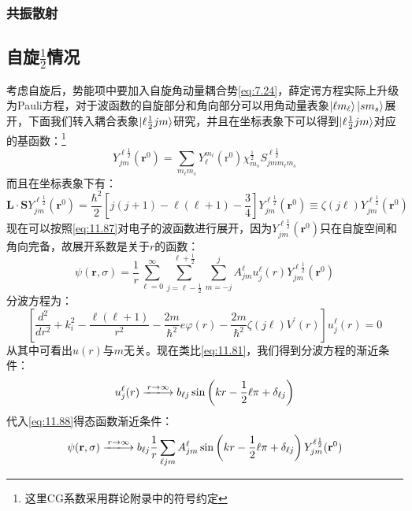\documentclass[a4paper,zihao=-4,linespread=1]{ctexrep}
\begin{document}
	\subsubsection{共振散射}
	
	
	\subsection{自旋$\frac{1}{2}$情况}
	考虑自旋后，势能项中要加入自旋角动量耦合势\ref{eq:7.24}，薛定谔方程实际上升级为Pauli方程，对于波函数的自旋部分和角向部分可以用角动量表象$\ket{\ell m_\ell}\ket{sm_s}$展开，下面我们转入耦合表象$\ket{\ell\frac{1}{2}jm}$研究，并且在坐标表象下可以得到$\ket{\ell\frac{1}{2}jm}$对应的基函数：\footnote{这里CG系数采用群论附录中的符号约定}
	\begin{equation}
		\label{eq:11.87}
		Y^{\ell\frac{1}{2}}_{jm}(\mathbf{r}^0)=\sum_{m_\ell m_s}Y^{m_\ell}_\ell (\mathrm{r}^0)\chi_{m_s}^\frac{1}{2}S_{jmm_\ell m_s}^{\ell\frac{1}{2}}
	\end{equation}
	而且在坐标表象下有：
	\[\mathbf{L}\cdot\mathbf{S}Y^{\ell\frac{1}{2}}_{jm}(\mathbf{r}^0)=\frac{\hbar^2}{2}\left[j(j+1)-\ell(\ell+1)-\frac{3}{4}\right]Y^{\ell\frac{1}{2}}_{jm}(\mathbf{r}^0)\equiv\zeta(j\ell)Y^{\ell\frac{1}{2}}_{jm}(\mathbf{r}^0)\]
	现在可以按照\ref{eq:11.87}对电子的波函数进行展开，因为$Y^{\ell\frac{1}{2}}_{jm}(\mathbf{r}^0)$只在自旋空间和角向完备，故展开系数是关于$r$的函数：
	\begin{equation}
		\label{eq:11.88}
		\psi(\mathbf{r},\sigma)=\frac{1}{r}\sum_{\ell=0}^\infty\sum_{j=\ell-\frac{1}{2}}^{\ell+\frac{1}{2}}\sum_{m=-j}^{j}A^{\ell}_{jm}u_j^\ell(r)Y^{\ell\frac{1}{2}}_{jm}(\mathbf{r}^0)
	\end{equation}
	分波方程为：
	\[\left[\frac{d^2}{dr^2}+k_i^2-\frac{\ell(\ell+1)}{r^2}-\frac{2m}{\hbar^2}e\varphi(r)-\frac{2m}{\hbar^2}\zeta(j\ell)V^\prime(r)\right]u_j^\ell(r)=0\]
	从其中可看出$u(r)$与$m$无关。现在类比\ref{eq:11.81}，我们得到分波方程的渐近条件：
	\[u_j^\ell(r)\xlongrightarrow{r\to\infty}b_{\ell j}\sin\left(kr-\frac{1}{2}\ell\pi+\delta_{\ell j}\right)\]
	代入\ref{eq:11.88}得态函数渐近条件：
	\begin{equation}
		\label{eq:11.89}
		\psi(\mathbf{r},\sigma)\xlongrightarrow{r\to\infty}b_{\ell j}\frac{1}{r}\sum_{\ell j m}A^{\ell}_{jm}\sin\left(kr-\frac{1}{2}\ell\pi+\delta_{\ell j}\right)Y^{\ell\frac{1}{2}}_{jm}(\mathbf{r}^0)
	\end{equation}
	
\end{document}
